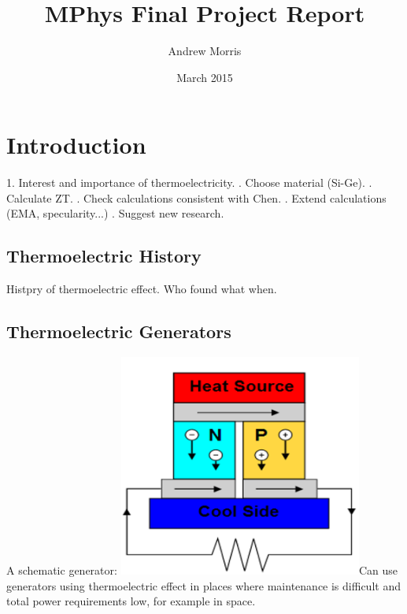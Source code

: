 \documentclass[twocolumn]{article}
\begin{document}
\title{MPhys Final Project Report} %
\author{Andrew Morris}%
\date{March 2015} %

\section{Introduction}
\label{sec:Introduction}

1. Interest and importance of thermoelectricity. . Choose material (Si-Ge). . Calculate ZT. . Check calculations consistent with Chen. . Extend calculations (EMA, specularity...) . Suggest new research. \newline

\subsection{Thermoelectric History}
\label{sec:Thermoelectric History}
Histpry of thermoelectric effect. Who found what when.

\subsection{Thermoelectric Generators}
\label{sec:Thermoelectric Generators}
A schematic generator:
\includegraphics[width=80mm]{schematic_generator.png}Can use generators using thermoelectric effect in places where maintenance is difficult and total power requirements low, for example in space.
\end{document}
